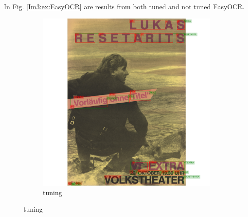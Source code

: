 
In Fig. \ref{Im3:ex:EasyOCR} are results from both tuned and not tuned EasyOCR. 

\begin{figure}[hbtp!]
    \begin{subfigure}{\textwidth}
        \centering
        \includegraphics[scale=0.29]{obrazky/plakaty/result_easyOCR_vienna2_nosplit_tuning-83.png}
        \caption{tuning}
        \label{Im3:ex:easytun}
    \end{subfigure}


\end{figure}
